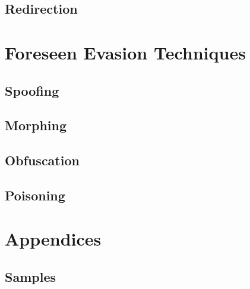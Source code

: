 \documentclass[11pt,fleqn,oneside]{book} %
\begin{document}
\chapter{Redirection} \label{ch:known-redirection}


\newpage


\part{Foreseen Evasion Techniques}
\chapter{Spoofing} \label{ch:foreseen-spoofing}


\chapter{Morphing} \label{ch:foreseen-morphing}


\chapter{Obfuscation} \label{ch:foreseen-obfuscation}


\chapter{Poisoning} \label{ch:foreseen-poisoning}



\renewcommand{\thechapter}{\Alph{chapter}}
\renewcommand{\thesection}{\Alph{chapter}.\Roman{section}}
\renewcommand{\thesubsection}{\Alph{chapter}.\Roman{section}.\alph{subsection}}
\part{Appendices}
\chapter{Samples}

\end{document}
